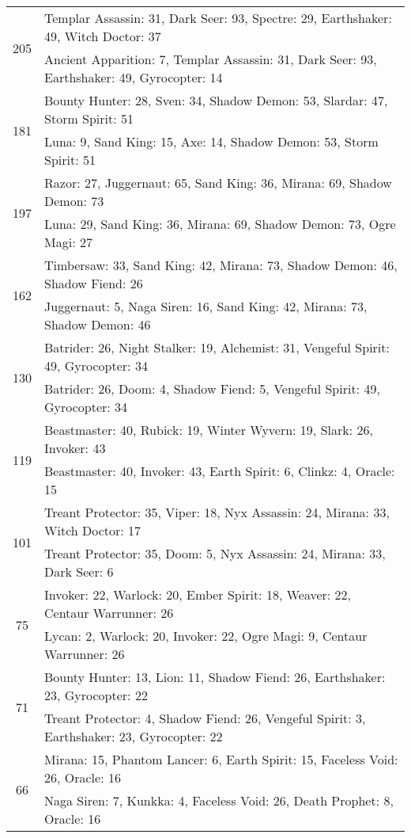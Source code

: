 \documentclass[result.tex]{subfiles}
\begin{document}
\begin{table}[H]
\begin{tabular}{ | c | p{12.5cm} | }
\hline
\multirow{2}{*}{205}
& Templar Assassin: 31, Dark Seer: 93, Spectre: 29, Earthshaker: 49, Witch Doctor: 37 \\
& Ancient Apparition: 7, Templar Assassin: 31, Dark Seer: 93, Earthshaker: 49, Gyrocopter: 14 \\
\hline
\multirow{2}{*}{181}
& Bounty Hunter: 28, Sven: 34, Shadow Demon: 53, Slardar: 47, Storm Spirit: 51 \\
& Luna: 9, Sand King: 15, Axe: 14, Shadow Demon: 53, Storm Spirit: 51 \\
\hline
\multirow{2}{*}{197}
& Razor: 27, Juggernaut: 65, Sand King: 36, Mirana: 69, Shadow Demon: 73 \\
& Luna: 29, Sand King: 36, Mirana: 69, Shadow Demon: 73, Ogre Magi: 27 \\
\hline
\multirow{2}{*}{162}
& Timbersaw: 33, Sand King: 42, Mirana: 73, Shadow Demon: 46, Shadow Fiend: 26 \\
& Juggernaut: 5, Naga Siren: 16, Sand King: 42, Mirana: 73, Shadow Demon: 46 \\
\hline
\multirow{2}{*}{130}
& Batrider: 26, Night Stalker: 19, Alchemist: 31, Vengeful Spirit: 49, Gyrocopter: 34 \\
& Batrider: 26, Doom: 4, Shadow Fiend: 5, Vengeful Spirit: 49, Gyrocopter: 34 \\
\hline
\multirow{2}{*}{119}
& Beastmaster: 40, Rubick: 19, Winter Wyvern: 19, Slark: 26, Invoker: 43 \\
& Beastmaster: 40, Invoker: 43, Earth Spirit: 6, Clinkz: 4, Oracle: 15 \\
\hline
\multirow{2}{*}{101}
& Treant Protector: 35, Viper: 18, Nyx Assassin: 24, Mirana: 33, Witch Doctor: 17 \\
& Treant Protector: 35, Doom: 5, Nyx Assassin: 24, Mirana: 33, Dark Seer: 6 \\
\hline
\multirow{2}{*}{75}
& Invoker: 22, Warlock: 20, Ember Spirit: 18, Weaver: 22, Centaur Warrunner: 26 \\
& Lycan: 2, Warlock: 20, Invoker: 22, Ogre Magi: 9, Centaur Warrunner: 26 \\
\hline
\multirow{2}{*}{71}
& Bounty Hunter: 13, Lion: 11, Shadow Fiend: 26, Earthshaker: 23, Gyrocopter: 22 \\
& Treant Protector: 4, Shadow Fiend: 26, Vengeful Spirit: 3, Earthshaker: 23, Gyrocopter: 22 \\
\hline
\multirow{2}{*}{66}
& Mirana: 15, Phantom Lancer: 6, Earth Spirit: 15, Faceless Void: 26, Oracle: 16 \\
& Naga Siren: 7, Kunkka: 4, Faceless Void: 26, Death Prophet: 8, Oracle: 16 \\

\end{tabular}
\end{table}
\end{document}

